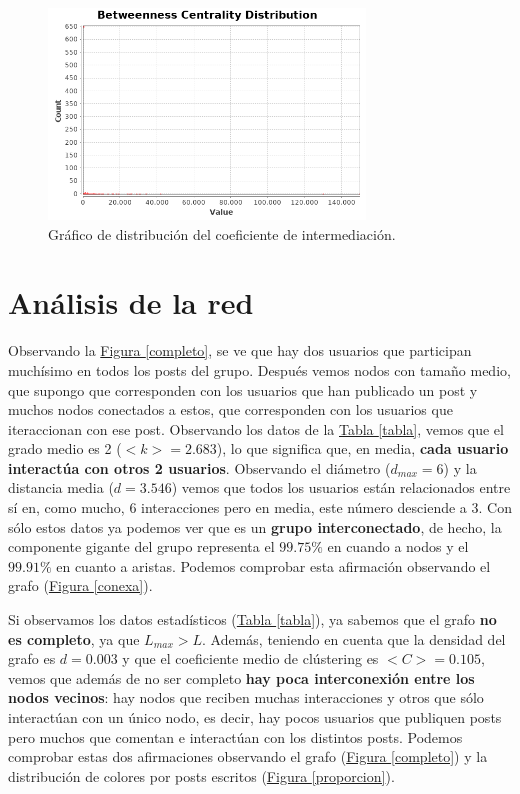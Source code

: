 \documentclass[10pt,a4paper,spanish]{article}
\numberwithin{equation}{section} %
\numberwithin{figure}{section} %
\numberwithin{table}{section} %
\begin{document}
\begin{figure}[!h]
    \centering
    \includegraphics[width=0.75\textwidth]{../diametro_red/Betweenness-Centrality-Distribution}
    \caption{Gráfico de distribución del coeficiente de intermediación.}
    \label{intermediacion}
\end{figure}

\newpage
\section{Análisis de la red}

Observando la \hyperref[completo]{Figura \ref*{completo}}, se ve que hay dos usuarios que participan muchísimo en todos los posts del grupo. Después vemos nodos con tamaño medio, que supongo que corresponden con los usuarios que han publicado un post y muchos nodos conectados a estos, que corresponden con los usuarios que iteraccionan con ese post. Observando los datos de la \hyperref[tabla]{Tabla \ref*{tabla}}, vemos que el grado medio es 2 ($<k>=2.683$), lo que significa que, en media, \textbf{cada usuario interactúa con otros 2 usuarios}. Observando el diámetro ($d_{max} = 6$) y la distancia media ($d = 3.546$) vemos que todos los usuarios están relacionados entre sí en, como mucho, 6 interacciones pero en media, este número desciende a 3. Con sólo estos datos ya podemos ver que es un \textbf{grupo interconectado}, de hecho, la componente gigante del grupo representa el $99.75\%$ en cuando a nodos y el $99.91\%$ en cuanto a aristas. Podemos comprobar esta afirmación observando el grafo (\hyperref[conexa]{Figura \ref*{conexa}}). 

Si observamos los datos estadísticos (\hyperref[tabla]{Tabla \ref*{tabla}}), ya sabemos que el grafo \textbf{no es completo}, ya que $L_{max} > L$. Además, teniendo en cuenta que la densidad del grafo es $d = 0.003$ y que el coeficiente medio de clústering es $<C> = 0.105$, vemos que además de no ser completo \textbf{hay poca interconexión entre los nodos vecinos}: hay nodos que reciben muchas interacciones y otros que sólo interactúan con un único nodo, es decir, hay pocos usuarios que publiquen posts pero muchos que comentan e interactúan con los distintos posts. Podemos comprobar estas dos afirmaciones observando el grafo (\hyperref[completo]{Figura \ref*{completo}}) y la distribución de colores por posts escritos (\hyperref[proporcion]{Figura \ref*{proporcion}}). 
\end{document}

